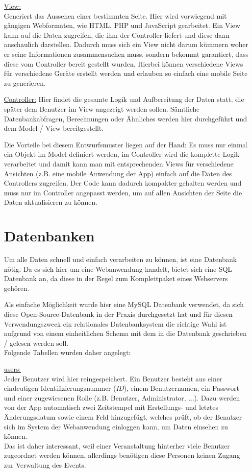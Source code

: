 \underline{View:}\\
Generiert das Aussehen einer bestimmten Seite. Hier wird vorwiegend mit gängigen Webformaten, wie HTML, PHP und JavaScript gearbeitet. Ein View kann auf die Daten zugreifen, die ihm der Controller liefert und diese dann anschaulich darstellen. Dadurch muss sich ein View nicht darum kümmern woher er seine Informationen zusammensuchen muss, sondern bekommt garantiert, dass diese vom Controller bereit gestellt wurden. Hierbei können verschiedene Views für verschiedene Geräte erstellt werden und erlauben so einfach eine mobile Seite zu generieren.

\underline{Controller:}
Hier findet die gesamte Logik und Aufbereitung der Daten statt, die später dem Benutzer im View angezeigt werden sollen. Sämtliche Datenbankabfragen, Berechnungen oder Ähnliches werden hier durchgeführt und dem Model / View bereitgestellt.
\par

Die Vorteile bei diesem Entwurfsmuster liegen auf der Hand: Es muss nur einmal ein Objekt im Model definiert werden, im Controller wird die komplette Logik verarbeitet und damit kann man mit entsprechenden Views für verschiedene Ansichten (z.B. eine mobile Anwendung der App) einfach auf die Daten des Controllers zugreifen. Der Code kann dadurch kompakter gehalten werden und muss nur im Controller angepasst werden, um auf allen Ansichten der Seite die Daten aktualisieren zu können.

\section{Datenbanken}
Um alle Daten schnell und einfach verarbeiten zu können, ist eine Datenbank nötig. Da es sich hier um eine Webanwendung handelt, bietet sich eine SQL Datenbank an, da diese in der Regel zum Komplettpaket eines Webservers gehören.\par

Als einfache Möglichkeit wurde hier eine MySQL Datenbank verwendet, da sich diese Open-Source-Datenbank in der Praxis durchgesetzt hat und für diesen Verwendungszweck ein relationales Datenbanksystem die richtige Wahl ist aufgrund von einem einheitlichen Schema mit dem in die Datenbank geschrieben / gelesen werden soll.\\
Folgende Tabellen wurden daher angelegt:\par

\underline{users:}\\
Jeder Benutzer wird hier reingespeichert. Ein Benutzer besteht aus einer eindeutigen Identifizierungsnummer (\emph{ID}), einem Benutzernamen, ein Passwort und einer zugewiesenen Rolle (z.B. Benutzer, Administrator, ...). Dazu werden von der App automatisch zwei Zeitstempel mit Erstellungs- und letztes Änderungsdatum sowie einem Feld hinzugefügt, welches prüft, ob der Benutzer sich im System der Webanwendung einloggen kann, um Daten einsehen zu können.\\
Das ist daher interessant, weil einer Veranstaltung hinterher viele Benutzer zugeordnet werden können, allerdings benötigen diese Personen keinen Zugang zur Verwaltung des Events.

